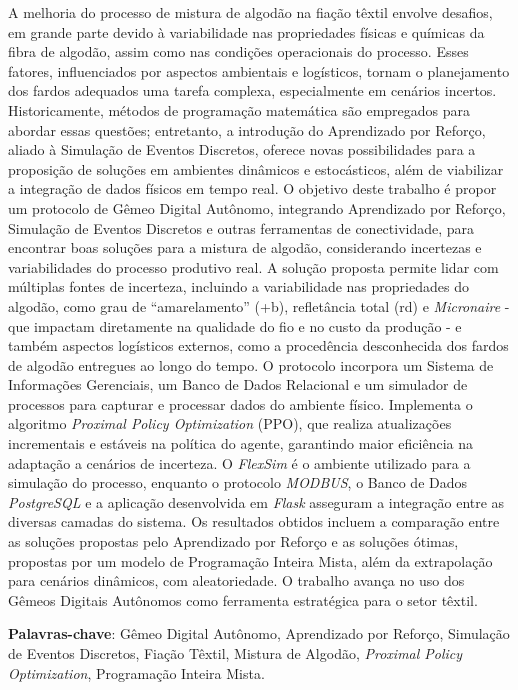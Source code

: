 \documentclass[
    12pt,                %
    openright,           %
    oneside,             %
    a4paper,             %
    english,             %
    spanish,             %
    brazil               %
]{ufscar}
\begin{document}

\cleardoublepage %



\setlength{\absparsep}{18pt} %
\begin{resumo}

A melhoria do processo de mistura de algodão na fiação têxtil envolve desafios, em grande parte devido à variabilidade nas propriedades físicas e químicas da fibra de algodão, assim como nas condições operacionais do processo. Esses fatores, influenciados por aspectos ambientais e logísticos, tornam o planejamento dos fardos adequados uma tarefa complexa, especialmente em cenários incertos. Historicamente, métodos de programação matemática são empregados para abordar essas questões; entretanto, a introdução do Aprendizado por Reforço, aliado à Simulação de Eventos Discretos, oferece novas possibilidades para a proposição de soluções em ambientes dinâmicos e estocásticos, além de viabilizar a integração de dados físicos em tempo real.
O objetivo deste trabalho é propor um protocolo de Gêmeo Digital Autônomo, integrando Aprendizado por Reforço, Simulação de Eventos Discretos e outras ferramentas de conectividade, para encontrar boas soluções para a mistura de algodão, considerando incertezas e variabilidades do processo produtivo real. A solução proposta permite lidar com múltiplas fontes de incerteza, incluindo a variabilidade nas propriedades do algodão, como grau de “amarelamento” (+b), refletância total (rd) e \textit{Micronaire} - que impactam diretamente na qualidade do fio e no custo da produção - e também aspectos logísticos externos, como a procedência desconhecida dos fardos de algodão entregues ao longo do tempo.
O protocolo incorpora um Sistema de Informações Gerenciais, um Banco de Dados Relacional e um simulador de processos para capturar e processar dados do ambiente físico. Implementa o algoritmo \textit{Proximal Policy Optimization} (PPO), que realiza atualizações incrementais e estáveis na política do agente, garantindo maior eficiência na adaptação a cenários de incerteza. O \textit{FlexSim} é o ambiente utilizado para a simulação do processo, enquanto o protocolo \textit{MODBUS}, o Banco de Dados \textit{PostgreSQL} e a aplicação desenvolvida em \textit{Flask} asseguram a integração entre as diversas camadas do sistema.
Os resultados obtidos incluem a comparação entre as soluções propostas pelo Aprendizado por Reforço e as soluções ótimas, propostas por um modelo de Programação Inteira Mista, além da extrapolação para cenários dinâmicos, com aleatoriedade. O trabalho avança no uso dos Gêmeos Digitais Autônomos como ferramenta estratégica para o setor têxtil.

\textbf{Palavras-chave}: Gêmeo Digital Autônomo, Aprendizado por Reforço, Simulação de Eventos Discretos, Fiação Têxtil, Mistura de Algodão, \textit{Proximal Policy Optimization}, Programação Inteira Mista.


\end{resumo}
\end{document}
